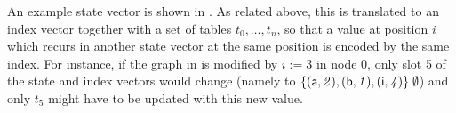 %
An example state vector is shown in . As related above, this is
translated to an index vector together with a set of tables $t_0,\ldots,t_n$,
so that a value at position $i$ which recurs in another state vector at the
same position is encoded by the same index. For instance, if the graph
in  is modified by $i:=3$ in node $0$, only slot
5 of the state and index vectors would change (namely to ${\{ (\mathsf
  a,\mathit 2),(\mathsf b,\mathit 1),(\mathsf i,\mathit 4) \}}\;\emptyset$) and
only $t_5$ might have to be updated with this new value.



